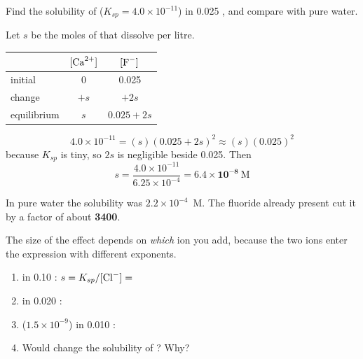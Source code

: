 \documentclass{apchem-notes}
\begin{document}
\begin{workedexample}
Find the solubility of  ($K_{sp} = 4.0\times10^{-11}$) in
\SI{0.025}{\Molar} , and compare with pure water.

Let $s$ be the moles of  that dissolve per litre.

\begin{center}
\begin{tabular}{@{}lcc@{}}
\hline
 & $[\ce{Ca^2+}]$ & $[\ce{F-}]$ \\
\hline
initial     & 0 & 0.025 \\
change      & $+s$ & $+2s$ \\
equilibrium & $s$ & $0.025 + 2s$ \\
\hline
\end{tabular}
\end{center}

\[ 4.0\times10^{-11} = (s)(0.025 + 2s)^2 \approx (s)(0.025)^2 \]
because $K_{sp}$ is tiny, so $2s$ is negligible beside 0.025. Then
\[ s = \frac{4.0\times10^{-11}}{6.25\times10^{-4}}
     = \mathbf{6.4\times10^{-8}}~\text{M} \]

In pure water the solubility was $2.2\times10^{-4}$~M. The fluoride already
present cut it by a factor of about \textbf{3400}.
\end{workedexample}


The size of the effect depends on \emph{which} ion you add, because the two
ions enter the expression with different exponents.

\begin{enumerate}[leftmargin=*,itemsep=0.35em]
  \item {} in \SI{0.10}{\Molar} : $s = K_{sp}/[\ce{Cl-}] =$
  \item {} in \SI{0.020}{\Molar} :
  \item {} ($1.5\times10^{-9}$) in \SI{0.010}{\Molar}
        : 
  \item Would  change the solubility of ? Why?
\end{enumerate}

\end{document}
